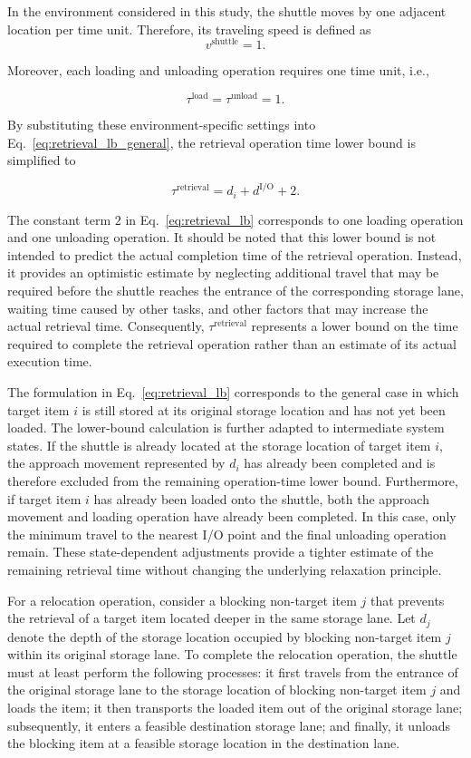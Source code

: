 In the environment considered in this study, the shuttle moves by one adjacent location per time unit. Therefore, its traveling speed is defined as
\[
v^{\mathrm{shuttle}} = 1.
\]

Moreover, each loading and unloading operation requires one time unit, i.e.,

\[
\tau^{\mathrm{load}}
=
\tau^{\mathrm{unload}}
=
1.
\]

By substituting these environment-specific settings into Eq.~\eqref{eq:retrieval_lb_general}, the retrieval operation time lower bound is simplified to

\begin{equation}
\boxed{
\tau^{\mathrm{retrieval}}
=
d_i
+
d^{\mathrm{I/O}}
+
2
}.
\label{eq:retrieval_lb}
\end{equation}

The constant term \(2\) in Eq.~\eqref{eq:retrieval_lb} corresponds to one loading operation and one unloading operation. It should be noted that this lower bound is not intended to predict the actual completion time of the retrieval operation. Instead, it provides an optimistic estimate by neglecting additional travel that may be required before the shuttle reaches the entrance of the corresponding storage lane, waiting time caused by other tasks, and other factors that may increase the actual retrieval time. Consequently, \(\tau^{\mathrm{retrieval}}\) represents a lower bound on the time required to complete the retrieval operation rather than an estimate of its actual execution time.

The formulation in Eq.~\eqref{eq:retrieval_lb} corresponds to the general case in which target item \(i\) is still stored at its original storage location and has not yet been loaded. The lower-bound calculation is further adapted to intermediate system states. If the shuttle is already located at the storage location of target item \(i\), the approach movement represented by \(d_i\) has already been completed and is therefore excluded from the remaining operation-time lower bound. Furthermore, if target item \(i\) has already been loaded onto the shuttle, both the approach movement and loading operation have already been completed. In this case, only the minimum travel to the nearest I/O point and the final unloading operation remain. These state-dependent adjustments provide a tighter estimate of the remaining retrieval time without changing the underlying relaxation principle.

For a relocation operation, consider a blocking non-target item \(j\) that prevents the retrieval of a target item located deeper in the same storage lane. Let \(d_j\) denote the depth of the storage location occupied by blocking non-target item \(j\) within its original storage lane. To complete the relocation operation, the shuttle must at least perform the following processes: it first travels from the entrance of the original storage lane to the storage location of blocking non-target item \(j\) and loads the item; it then transports the loaded item out of the original storage lane; subsequently, it enters a feasible destination storage lane; and finally, it unloads the blocking item at a feasible storage location in the destination lane.


